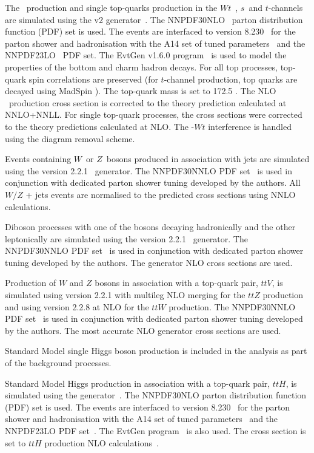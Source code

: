 The \ttbar\ production and single top-quarks production in the $Wt$~, $s$~and $t$-channels are simulated using the \POWHEGBOX v2 generator~\cite{Powheg1, Powheg2, Powheg3}. The NNPDF30NLO~\cite{NNPDF} parton distribution function (PDF) set is used. The events are interfaced to  version  8.230~\cite{PYTHIA82} for the parton shower and hadronisation with the A14 set of tuned parameters~\cite{A14tune, ATLAS:2012uec} and the NNPDF23LO~\cite{NNPDF23PDFSet} PDF set. The EvtGen v1.6.0 program~\cite{EvtGen} is used to model the properties of the bottom and charm hadron decays. For all top processes, top-quark spin correlations are preserved (for $t$-channel production, top quarks are decayed using MadSpin \cite{MadSpin}). The top-quark mass is set to 172.5 \GeV.  The NLO \ttbar\ production cross section is corrected to the theory prediction calculated at NNLO+NNLL. For single top-quark processes, the cross sections were corrected to the theory predictions calculated at NLO. The \ttbar-$Wt$ interference is handled using the diagram removal scheme.
 
Events containing $W$\ or $Z$\ bosons produced in association with jets are simulated using the \SHERPA version 2.2.1~\cite{Bothmann:2019yzt} generator. The NNPDF30NNLO PDF set~\cite{NNPDF} is used in conjunction with dedicated parton shower tuning developed by the \SHERPA authors.  All $W/Z$ + jets events are normalised to the predicted cross sections using NNLO calculations.

Diboson processes with one of the bosons decaying hadronically and the other leptonically are simulated using the \SHERPA version 2.2.1~\cite{Bothmann:2019yzt} generator. The NNPDF30NNLO PDF set~\cite{NNPDF} is used in conjunction with dedicated parton shower tuning developed by the \SHERPA authors. The generator NLO cross sections are used.

Production of $W$ and $Z$ bosons in association with a top-quark pair, $ttV$, is simulated using \SHERPA version 2.2.1 with multileg NLO merging for the $ttZ$ production and using \SHERPA version 2.2.8 at NLO for the $ttW$ production. The NNPDF30NNLO PDF set~\cite{NNPDF} is used in conjunction with dedicated parton shower tuning developed by the \SHERPA authors. The most accurate NLO generator cross sections are used.

Standard Model single Higgs boson production is included in the analysis as part of the background processes. 

Standard Model Higgs production in association with a top-quark pair, $ttH$, is simulated using the \POWHEGBOX generator~\cite{Powheg1, Powheg2, Powheg3}. The NNPDF30NLO parton distribution function (PDF) set is used. The events are interfaced to  version  8.230~\cite{PYTHIA82} for the parton shower and hadronisation with the A14 set of tuned parameters~\cite{A14tune, ATLAS:2012uec} and the NNPDF23LO PDF set~\cite{NNPDF23PDFSet}. The EvtGen program~\cite{EvtGen} is also used. The cross section is set to $ttH$ production NLO calculations~\cite{Hxsec}.

